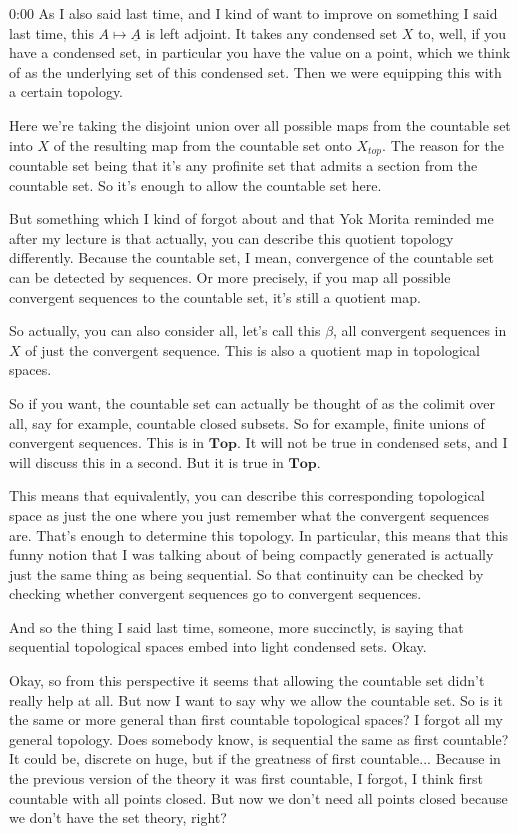 \begin{unfinished}{0:00}
As I also said last time, and I kind of want to improve on something I said last time, this $A\mapsto \underline{A}$ is left adjoint. It takes any condensed set $X$ to, well, if you have a condensed set, in particular you have the value on a point, which we think of as the underlying set of this condensed set. Then we were equipping this with a certain topology.

Here we're taking the disjoint union over all possible maps from the countable set into $X$ of the resulting map from the countable set onto $X_{top}$. The reason for the countable set being that it's any profinite set that admits a section from the countable set. So it's enough to allow the countable set here.

But something which I kind of forgot about and that Yok Morita reminded me after my lecture is that actually, you can describe this quotient topology differently. Because the countable set, I mean, convergence of the countable set can be detected by sequences. Or more precisely, if you map all possible convergent sequences to the countable set, it's still a quotient map.

So actually, you can also consider all, let's call this $\beta$, all convergent sequences in $X$ of just the convergent sequence. This is also a quotient map in topological spaces.

So if you want, the countable set can actually be thought of as the colimit over all, say for example, countable closed subsets. So for example, finite unions of convergent sequences. This is in $\mathbf{Top}$. It will not be true in condensed sets, and I will discuss this in a second. But it is true in $\mathbf{Top}$.

This means that equivalently, you can describe this corresponding topological space as just the one where you just remember what the convergent sequences are. That's enough to determine this topology. In particular, this means that this funny notion that I was talking about of being compactly generated is actually just the same thing as being sequential. So that continuity can be checked by checking whether convergent sequences go to convergent sequences.

And so the thing I said last time, someone, more succinctly, is saying that sequential topological spaces embed into light condensed sets. Okay.

Okay, so from this perspective it seems that allowing the countable set didn't really help at all. But now I want to say why we allow the countable set. So is it the same or more general than first countable topological spaces? I forgot all my general topology. Does somebody know, is sequential the same as first countable? It could be, discrete on huge, but if the greatness of first countable... Because in the previous version of the theory it was first countable, I forgot, I think first countable with all points closed. But now we don't need all points closed because we don't have the set theory, right?


\end{unfinished}
